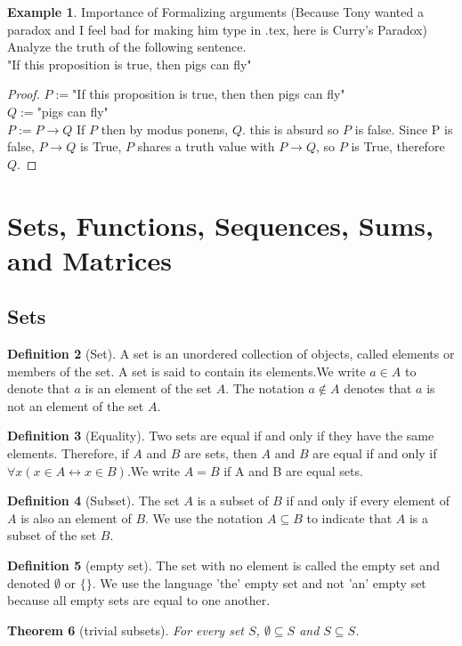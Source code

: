 \documentclass[letterpaper,10pt]{article}
\theoremstyle{plain}
\newtheorem{thm}{Theorem}[section]
\theoremstyle{definition}
\newtheorem{defn}[thm]{Definition}
\newtheorem{exmp}[thm]{Example}
\theoremstyle{remark}
\begin{document}
\vspace{3cm}

\begin{exmp}{Importance of Formalizing arguments}
(Because Tony wanted a paradox and I feel bad for making him type in .tex, here is Curry's Paradox)\\

Analyze the truth of the following sentence.\\

"If this proposition is true, then pigs can fly"\\
\end{exmp}
\begin{proof}
$P:=$"If this proposition is true, then then pigs can fly"\\
$Q:=$"pigs can fly"\\
$P:=P\to Q$
If $P$ then by modus ponens, $Q$. this is absurd so $P$ is false. Since P is false, $P\to Q$ is True, $P$ shares a truth value with $P\to Q$, so $P$ is True, therefore $Q$.
\end{proof}



\newpage
\section{Sets, Functions, Sequences, Sums, and Matrices}
\subsection{Sets}

\begin{defn}[Set]
A set is an unordered collection of objects, called elements or members of the set. A set is
said to contain its elements.We write $a \in A$ to denote that $a$ is an element of the set $A$. The
notation $a \notin A$ denotes that $a$ is not an element of the set $A$.
\end{defn}
\begin{defn}[Equality]
Two sets are equal if and only if they have the same elements. Therefore, if $A$ and $B$ are sets,
then $A$ and $B$ are equal if and only if $\forall x(x \in A \leftrightarrow x \in B)$.We write $A = B$ if A and B are
equal sets.
\end{defn}
\begin{defn}[Subset]
The set $A$ is a subset of $B$ if and only if every element of $A$ is also an element of $B$. We use
the notation $A \subseteq B$ to indicate that $A$ is a subset of the set $B$.
\end{defn}
\begin{defn}[empty set]
The set with no element is called the empty set and denoted $\emptyset$ or $\{\}$. We use the language 'the' empty set and not 'an' empty set because all empty sets are equal to one another.
\end{defn}
\begin{thm}[trivial subsets]
For every set $S$, $\emptyset \subseteq S$ and $S \subseteq S$.
\end{thm}
\end{document}

